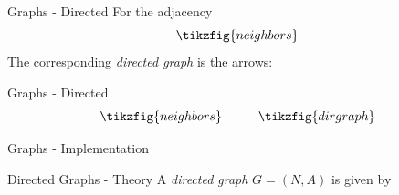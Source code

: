 \begin{frame}{Graphs - Directed}
	For the adjacency
	\[
		\tikzfig{neighbors}
	\]
	The corresponding \emph{directed graph} is
	the arrows:
\end{frame}
%
\begin{frame}{Graphs - Directed}
	\[
		\tikzfig{neighbors}
		\hspace{1cm}
		\tikzfig{dirgraph}
	\]
\end{frame}
%
\begin{frame}{Graphs - Implementation}
	
\end{frame}
%
\begin{frame}{Directed Graphs - Theory}
	A \emph{directed graph} $G = (N, A)$ is given by
\end{frame}
